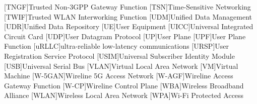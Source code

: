 \begin{multicols}{2}
\begin{acronym}[WPA]
        [TNGF]{Trusted Non-3GPP Gateway Function}
        [TSN]{Time-Sensitive Networking}
        [TWIF]{Trusted WLAN Interworking Function}
        [UDM]{Unified Data Management}
        [UDR]{Unified Data Repository}
        [UE]{User Equipment}
        [UICC]{Universal Integrated Circuit Card}
        [UDP]{User Datagram Protocol}
        [UP]{User Plane}
        [UPF]{User Plane Function}
        [uRLLC]{ultra-reliable low-latency communications}
        [URSP]{User Registration Service Protocol}
        [USIM]{Universal Subscriber Identity Module}
        [USB]{Universal Serial Bus}
        [VLAN]{Virtual Local Area Network}
        [VM]{Virtual Machine}
        [W-5GAN]{Wireline 5G Access Network}
        [W-AGF]{Wireline Access Gateway Function}
        [W-CP]{Wireline Control Plane}
        [WBA]{Wireless Broadband Alliance}
        [WLAN]{Wireless Local Area Network}
        [WPA]{Wi-Fi Protected Access}
    \end{acronym}
\end{multicols}
